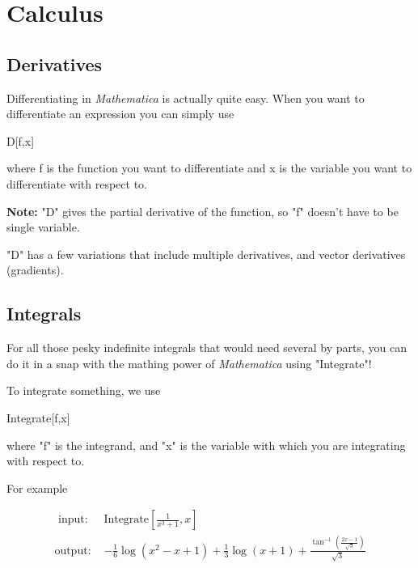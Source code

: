 \documentclass[11pt,a4paper,twoside]{article}
\begin{document}
		\section{Calculus}
			
			\subsection{Derivatives}
						
				Differentiating in \textit{Mathematica} is actually quite easy.  When you want to differentiate an expression you can simply use 
					
				\begin{center} D[f,x] \end{center}
					
				where f is the function you want to differentiate and x is the variable you want to differentiate with respect to.
					
				\textbf{Note:} "D" gives the partial derivative of the function, so "f" doesn't have to be single variable.
					
				"D" has a few variations that include multiple derivatives, and vector derivatives (gradients).
						
			\subsection{Integrals}
						
				For all those pesky indefinite integrals that would need several by parts, you can do it in a snap with the mathing power of \textit{Mathematica} using "Integrate"!
					
				To integrate something, we use
					
				\begin{center}
					
					Integrate[f,x]
					
				\end{center}
					
				where "f" is the integrand, and "x" is the variable with which you are integrating with respect to.
						
				For example
						
				\begin{align*}
					\text{ input: }& \text{Integrate} \left[ \frac{1}{x^3 + 1}, x \right] \\		
					\text{output: }& -\frac{1}{6} \log \left(x^2-x+1\right)+\frac{1}{3} \log (x+1)+\frac{\tan ^{-1}\left(\frac{2 x-1}{\sqrt{3}}\right)}{\sqrt{3}} \\
				\end{align*}
						
\end{document}
